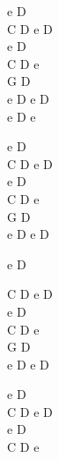 \begin{chord}
    \small{
    e D\\
    C D e D\\
    e D\\
    C D e\\
    G D\\
    e D e D\\
    e D e

    e D\\
    C D e D\\
    e D\\
    C D e\\
    G D\\
    e D e D

    e D

    C D e D\\
    e D\\
    C D e\\
    G D\\
    e D e D

    e D\\
    C D e D\\
    e D\\
    C D e\\
    }
\end{chord}